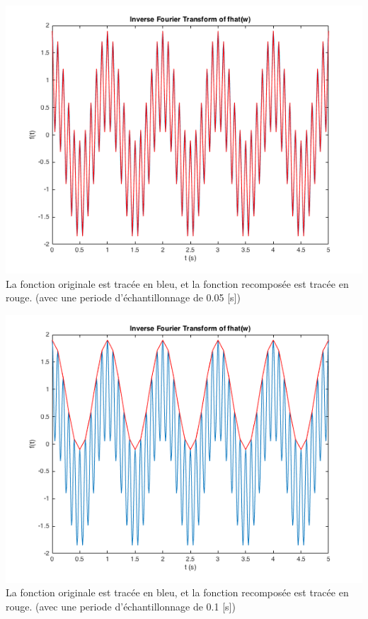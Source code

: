 \documentclass[a4paper,11pt]{article}
\begin{document}
\begin{center}
\includegraphics[scale=0.6]{"f_and_f_ifft1.png"} \newline
La fonction originale est tracée en bleu, et la fonction recomposée est tracée en rouge. (avec une periode d'échantillonnage de 0.05 [s]) 
\end{center} 

\begin{center}
\includegraphics[scale=0.6]{"f_and_f_ifft2.png"} \newline
La fonction originale est tracée en bleu, et la fonction recomposée est tracée en rouge. (avec une periode d'échantillonnage de 0.1 [s]) 
\end{center} 
\end{document}
